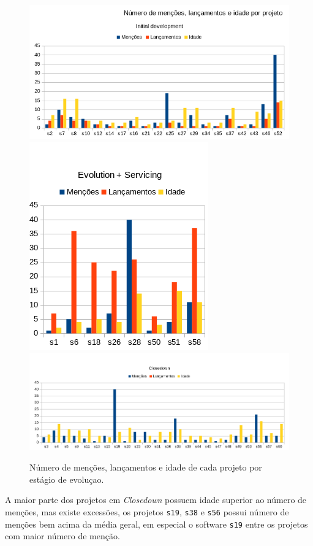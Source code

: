 \begin{figure}[h]
  \centering
  \includegraphics[scale=0.6]{imagens/age-initial-development.png}
  \includegraphics[scale=0.6]{imagens/age-evolution-servicing.png}
  \includegraphics[scale=0.6]{imagens/age-closedown.png}
  \caption{Número de menções, lançamentos e idade de cada projeto por estágio de evoluçao.}
  \label{age-releases-mentions}
\end{figure}

A maior parte dos projetos em {\it Closedown} possuem idade superior ao número
de menções, mas existe excessões, os projetos \texttt{s19}, \texttt{s38} e
\texttt{s56} possui número de menções bem acima da média geral, em especial o
software \texttt{s19} entre os projetos com maior número de menção.


